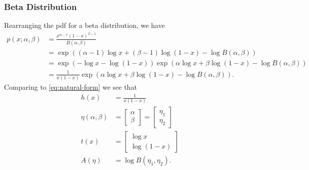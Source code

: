 \documentclass[a4paper]{article}
\theoremstyle{definition}
\begin{document}
\subsubsection{Beta Distribution}
Rearranging the pdf for a beta distribution, we have
\begin{align}
p( x ; \alpha, \beta ) &= \frac{ x^{ \alpha - 1} ( 1 - x )^{ \beta - 1 } }{ B( \alpha, \beta )} \\
&= \exp \left( ( \alpha - 1 ) \log x + ( \beta - 1 ) \log ( 1 - x ) - \log B( \alpha, \beta ) \right)\\
&= \exp \left( - \log x - \log ( 1 - x ) \right) \exp \left( \alpha \log x + \beta \log ( 1 - x ) - \log B( \alpha, \beta ) \right)\\
&= \frac{ 1 }{ x ( 1 - x ) } \exp \left( \alpha \log x + \beta \log ( 1 - x ) - \log B( \alpha, \beta ) \right).
\end{align}
Comparing to \eqref{eq:natural-form} we see that
\begin{align}
h(x) &= \frac{ 1 }{ x ( 1 - x ) } \\
\eta(\alpha, \beta) &= \begin{bmatrix} \alpha \\ \beta \end{bmatrix} = \begin{bmatrix} \eta_1 \\ \eta_2 \end{bmatrix} \\
t(x) &=  \begin{bmatrix} \log x \\ \log( 1 - x ) \end{bmatrix} \\
A(\eta) &= \log B (\eta_1, \eta_2 ).
\end{align}
\end{document}
